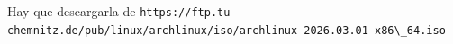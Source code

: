 Hay que descargarla de \small{\verb+https://ftp.tu-chemnitz.de/pub/linux/archlinux/iso/archlinux-2026.03.01-x86\_64.iso+}
